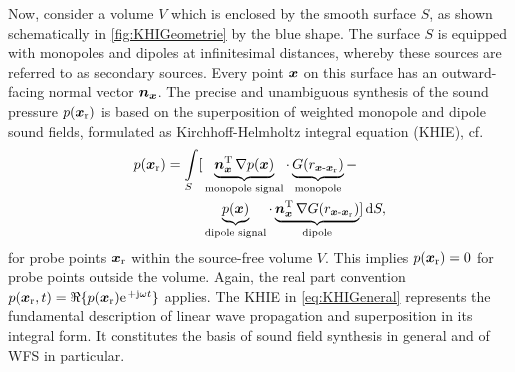 Now, consider a volume $V$ which is enclosed by the smooth surface $S$, as shown
schematically in \myfig\ref{fig:KHIGeometrie} by the blue shape.
%
The surface $S$ is equipped with monopoles and dipoles at infinitesimal
distances, whereby these sources are referred to as secondary
sources.
%
Every point $\bm{x}$ on this surface has an outward-facing normal vector $\bm{n}_{\bm{x}}$.
%
The precise and unambiguous synthesis of the sound pressure $p(\bm{x}_\mathrm{r})$ is based
on the superposition of weighted monopole and dipole sound fields, formulated
as Kirchhoff-Helmholtz integral equation (KHIE), cf.~\cite[Ch.~23.2]{Skudrzyk1971}
%
\begin{align} %
\label{eq:KHIGeneral}
p(\xr) = \int\limits_S
[
&\underbrace{\nxT \, \nabla p(\xs)}_{\text{monopole signal}}\cdot
\underbrace{G(r_{\xs\text{-}\xr})}_{\text{monopole}}
-\nonumber\\
&\underbrace{p(\xs)}_{\text{dipole signal}} \cdot
\underbrace{\nxT \, \nabla G(r_{\xs\text{-}\xr})}_{\text{dipole}}
]
\,\mathrm{d}S,
\end{align}
%
for probe points $\bm{x}_\mathrm{r}$ within the source-free volume $V$.
%
This implies $p(\bm{x}_\mathrm{r})=0$ for probe points outside the volume.
%
Again, the real part convention
$p(\xr, t) = \Re\{p(\xr) \e^{+\im \omega t}\}$ applies.
%
The KHIE in \myeq\eqref{eq:KHIGeneral} represents the fundamental description
of linear wave propagation and superposition in its integral form.
%
It constitutes the basis of sound field synthesis in general and of WFS
in particular.



